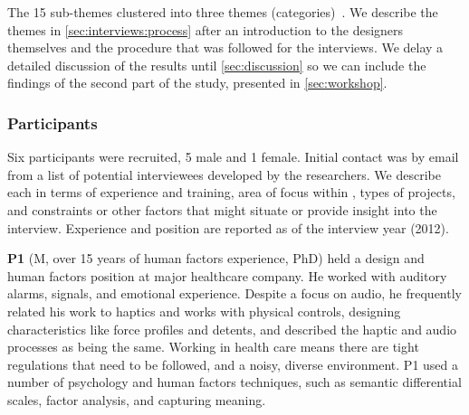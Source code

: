 The 15 sub-themes clustered into three themes (categories)~\citep{Corbin2008,Ryan2003}.
We describe the themes in \autoref{sec:interviews:process} after an introduction to the designers themselves and the
procedure that was followed for the interviews.
We delay a detailed discussion of the results until \autoref{sec:discussion}
so we can 
include
the findings of the second part of the study,
presented in \autoref{sec:workshop}.

\subsubsection{Participants}
\label{sec:interview:participants}

\noindent
Six participants were recruited, 5 male and 1 female. Initial contact was by email from a list of potential interviewees developed by the researchers. We describe each in terms of experience and training, area of focus within \haxd{}, types of projects, and constraints or other factors that might situate or provide insight into the interview.
Experience and position are reported as of the interview year (2012).

        \textbf{P1} (M, over 15 years of human factors experience, PhD) held a design and human factors position at major healthcare company.
         He worked with auditory alarms, signals, and emotional experience.
         Despite a focus on audio, he frequently related his work to haptics and works with physical controls, designing characteristics like force profiles and detents, and
         described the haptic and audio processes as being the same. %
         Working in health care means there are tight regulations that need to be followed, and a noisy, diverse environment.
         P1 used a number of psychology and human factors techniques, such as semantic differential scales, factor analysis, and capturing meaning.
          
